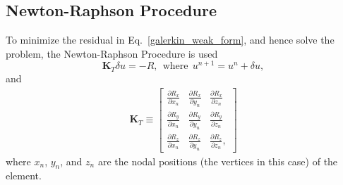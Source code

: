 \subsection{Newton-Raphson Procedure}

To minimize the residual in Eq.\ \eqref{galerkin_weak_form}, and hence solve the problem, the Newton-Raphson Procedure is used
%
\begin{equation}
\pmb{K}_T \delta u = -R, \ \ \text{where} \ \ u^{n+1} = u^{n} + \delta u,
\end{equation}
%
and 
%
\begin{eqnarray}
\pmb{K}_T \equiv
\begin{bmatrix}
\frac{\partial R_x}{\partial x_n} & \frac{\partial R_x}{\partial y_n} & \frac{\partial R_x}{\partial z_n} \\
\frac{\partial R_y}{\partial x_n} & \frac{\partial R_y}{\partial y_n} & \frac{\partial R_y}{\partial z_n} \\
\frac{\partial R_z}{\partial x_n} & \frac{\partial R_z}{\partial y_n} & \frac{\partial R_z}{\partial z_n} ,
\label{tangent_stiffness}
\end{bmatrix}
\end{eqnarray}
%
where $x_n$, $y_n$, and $z_n$ are the nodal positions (the vertices in this case) of the element.

